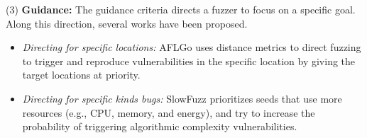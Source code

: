 (3)  \textbf{Guidance:} The guidance criteria directs a fuzzer to focus on a specific goal. %
Along this direction, several works have been proposed.
\begin{itemize}
\item \textit{Directing for specific locations:} AFLGo \cite{bohme2017aflgo} uses distance metrics to direct fuzzing to trigger and reproduce vulnerabilities in the specific location by giving the target locations at priority.

\item \textit{Directing for specific kinds bugs:} SlowFuzz \cite{petsios2017slowfuzz} prioritizes seeds that use more resources (e.g., CPU, memory, and energy), and try to increase the probability of triggering algorithmic complexity vulnerabilities. 
\end{itemize}
